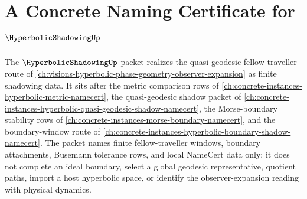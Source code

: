 \chapter{A Concrete Naming Certificate for $\HyperbolicShadowingUp$}
\label{ch:concrete-instances-hyperbolic-shadowing-namecert}

The $\HyperbolicShadowingUp$ packet realizes the quasi-geodesic fellow-traveller route of \autoref{ch:visions-hyperbolic-phase-geometry-observer-expansion} as finite shadowing data. It sits after the metric comparison rows of \autoref{ch:concrete-instances-hyperbolic-metric-namecert}, the quasi-geodesic shadow packet of \autoref{ch:concrete-instances-hyperbolic-quasi-geodesic-shadow-namecert}, the Morse-boundary stability rows of \autoref{ch:concrete-instances-morse-boundary-namecert}, and the boundary-window route of \autoref{ch:concrete-instances-hyperbolic-boundary-shadow-namecert}. The packet names finite fellow-traveller windows, boundary attachments, Busemann tolerance rows, and local NameCert data only; it does not complete an ideal boundary, select a global geodesic representative, quotient paths, import a host hyperbolic space, or identify the observer-expansion reading with physical dynamics.

